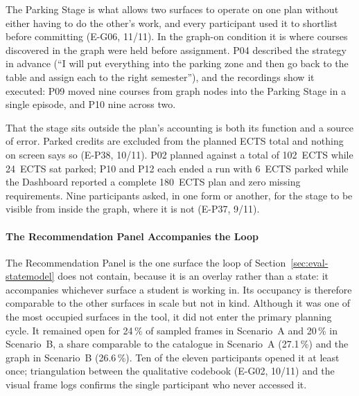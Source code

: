 The Parking Stage is what allows two surfaces to operate on one plan without either having to do the other's work, and every participant used it to shortlist before committing (E-G06, 11/11). In the graph-on condition it is where courses discovered in the graph were held before assignment. P04 described the strategy in advance (\enquote{I will put everything into the parking zone and then go back to the table and assign each to the right semester}), and the recordings show it executed: P09 moved nine courses from graph nodes into the Parking Stage in a single episode, and P10 nine across two.

That the stage sits outside the plan's accounting is both its function and a source of error. Parked credits are excluded from the planned ECTS total and nothing on screen says so (E-P38, 10/11). P02 planned against a total of 102~ECTS while 24~ECTS sat parked; P10 and P12 each ended a run with 6~ECTS parked while the Dashboard reported a complete 180~ECTS plan and zero missing requirements. Nine participants asked, in one form or another, for the stage to be visible from inside the graph, where it is not (E-P37, 9/11).

\paragraph{The Recommendation Panel Accompanies the Loop}
\label{sec:eval-recs}
The Recommendation Panel is the one surface the loop of Section~\ref{sec:eval-statemodel} does not contain, because it is an overlay rather than a state: it accompanies whichever surface a student is working in. Its occupancy is therefore comparable to the other surfaces in scale but not in kind. Although it was one of the most occupied surfaces in the tool, it did not enter the primary planning cycle. It remained open for 24\,\% of sampled frames in Scenario~A and 20\,\% in Scenario~B, a share comparable to the catalogue in Scenario~A (27.1\,\%) and the graph in Scenario~B (26.6\,\%). Ten of the eleven participants opened it at least once; triangulation between the qualitative codebook (E-G02, 10/11) and the visual frame logs confirms the single participant who never accessed it.

